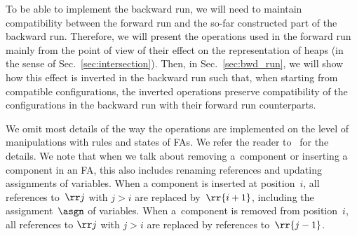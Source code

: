 {%
%
To be able to implement the backward run, we will need to maintain
compatibility between the forward run and the so-far constructed part
of the backward run.
%
Therefore, we will present the operations used in the forward run mainly from
the point of view of their effect on the representation  of heaps (in the sense
of Sec.~\ref{sec:intersection}).
%
Then, in Sec.~\ref{sec:bwd_run}, we will show how this effect is inverted in
the backward run such that, when starting from compatible
configurations, the inverted operations preserve compatibility of the
configurations in the backward run with their forward run counterparts.



%
We omit most details of the way the operations are implemented on the level of manipulations with rules and states of FAs. 
We refer the reader to~\cite{forester12,jiri:diza} for the details.
%
We note that when we talk about removing a~component or inserting a component
in an FA, this also includes renaming references and updating
assignments of variables.
%
When a component is inserted at position~$i$, all references to~$\rr j$ with
$j>i$ are replaced by~$\rr{i+1}$, including the assignment~$\asgn$ of variables.
%
When a~component is removed from position~$i$, all references to $\rr j$ with $j > i$ are
replaced by references to~$\rr{j-1}$. 




%
%

}
